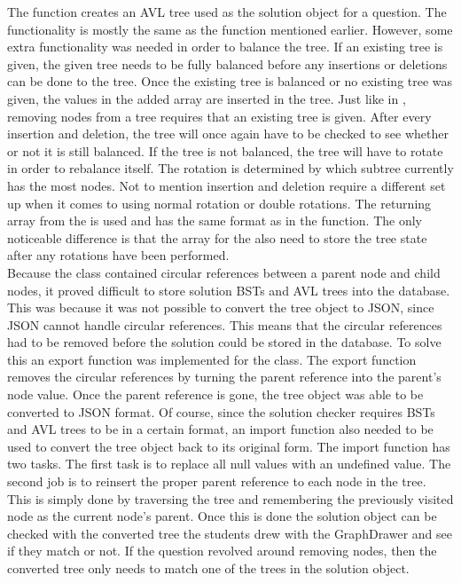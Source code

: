 The function  creates an AVL tree used as the solution object for a question. The functionality is mostly the same as the  function mentioned earlier. However, some extra functionality was needed in order to balance the tree. If an existing tree is given, the given tree needs to be fully balanced before any insertions or deletions can be done to the tree. Once the existing tree is balanced or no existing tree was given, the values in the added array are inserted in the tree. Just like in , removing nodes from a tree requires that an existing tree is given. After every insertion and deletion, the tree will once again have to be checked to see whether or not it is still balanced. If the tree is not balanced, the tree will have to rotate in order to rebalance itself. The rotation is determined by which subtree currently has the most nodes. Not to mention insertion and deletion require a different set up when it comes to using normal rotation or double rotations. The returning array from the  is used and has the same format as in the  function. The only noticeable difference is that the array for the  also need to store the tree state after any rotations have been performed.
\\[11pt]
Because the  class contained circular references between a parent node and child nodes, it proved difficult to store solution BSTs and AVL trees into the database. This was because it was not possible to convert the tree object to JSON, since JSON cannot handle circular references. This means that the circular references had to be removed before the solution could be stored in the database. To solve this an export function was implemented for the  class. The export function removes the circular references by turning the parent reference into the parent's node value. Once the parent reference is gone, the tree object was able to be converted to JSON format. Of course, since the solution checker requires BSTs and AVL trees to be in a certain format, an import function also needed to be used to convert the tree object back to its original form. The import function has two tasks. The first task is to replace all null values with an undefined value. The second job is to reinsert the proper parent reference to each node in the tree. This is simply done by traversing the tree and remembering the previously visited node as the current node's parent. Once this is done the solution object can be checked with the converted tree the students drew with the GraphDrawer and see if they match or not. If the question revolved around removing nodes, then the converted tree only needs to match one of the trees in the solution object.

